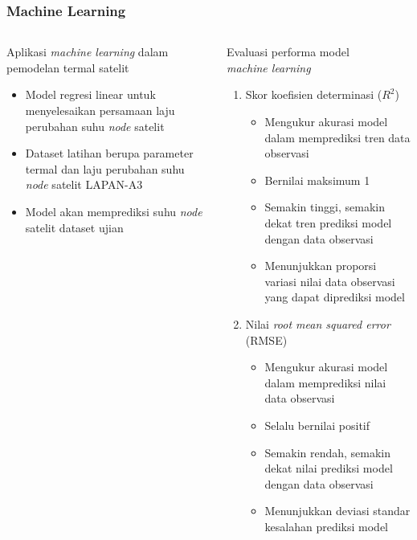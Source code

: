 \documentclass[8pt]{beamer}
\begin{document}
\begin{frame}
  \frametitle{Machine Learning}
  \begin{columns}[T]
    \begin{block}{\center Aplikasi \textit{machine learning} dalam pemodelan termal satelit}
      \begin{itemize}
        \item Model regresi linear untuk menyelesaikan persamaan laju perubahan suhu \textit{node} satelit
        \item Dataset latihan berupa parameter termal dan laju perubahan suhu \textit{node} satelit LAPAN-A3
        \item Model akan memprediksi suhu \textit{node} satelit dataset ujian
      \end{itemize}
    \end{block}
    \begin{block}{\center Evaluasi performa model \\ \textit{machine learning}}
      \begin{enumerate}
        \item Skor koefisien determinasi ($R^2$) \cite{gupta2021}
          \begin{itemize}
            \item Mengukur akurasi model dalam memprediksi tren data observasi
            \item Bernilai maksimum 1
            \item Semakin tinggi, semakin dekat tren prediksi model dengan data observasi
            \item Menunjukkan proporsi variasi nilai data observasi yang dapat diprediksi model
          \end{itemize}
        \item Nilai \textit{root mean squared error} (RMSE) \cite{zheng}
          \begin{itemize}
            \item Mengukur akurasi model dalam memprediksi nilai data observasi
            \item Selalu bernilai positif
            \item Semakin rendah, semakin dekat nilai prediksi model dengan data observasi
            \item Menunjukkan deviasi standar kesalahan prediksi model
          \end{itemize}
        \end{enumerate}
    \end{block}
  \end{columns}
\end{frame}
\end{document}
